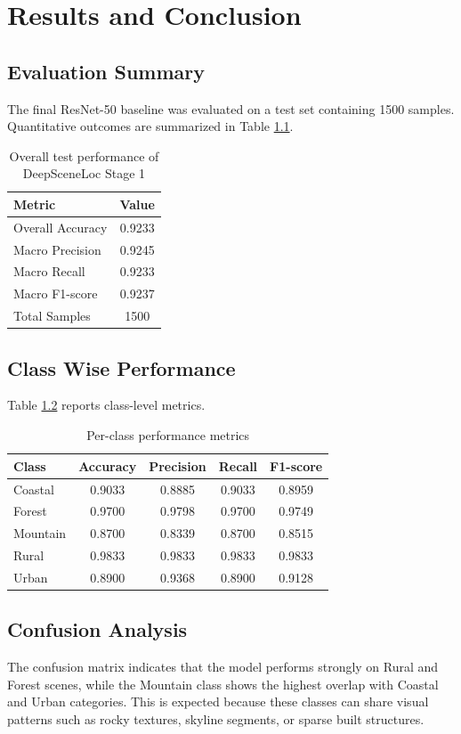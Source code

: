 \chapter{Results and Conclusion}

\section{Evaluation Summary}
The final ResNet-50 baseline was evaluated on a test set containing 1500 samples. Quantitative outcomes are summarized in Table \ref{tab:overall-metrics}.

\begin{table}[h]
\centering
\caption{Overall test performance of DeepSceneLoc Stage 1}
\label{tab:overall-metrics}
\begin{tabular}{lc}
\toprule
Metric & Value \\
\midrule
Overall Accuracy & 0.9233 \\
Macro Precision & 0.9245 \\
Macro Recall & 0.9233 \\
Macro F1-score & 0.9237 \\
Total Samples & 1500 \\
\bottomrule
\end{tabular}
\end{table}

\section{Class Wise Performance}
Table \ref{tab:class-metrics} reports class-level metrics.

\begin{table}[h]
\centering
\caption{Per-class performance metrics}
\label{tab:class-metrics}
\begin{tabular}{lcccc}
\toprule
Class & Accuracy & Precision & Recall & F1-score \\
\midrule
Coastal & 0.9033 & 0.8885 & 0.9033 & 0.8959 \\
Forest & 0.9700 & 0.9798 & 0.9700 & 0.9749 \\
Mountain & 0.8700 & 0.8339 & 0.8700 & 0.8515 \\
Rural & 0.9833 & 0.9833 & 0.9833 & 0.9833 \\
Urban & 0.8900 & 0.9368 & 0.8900 & 0.9128 \\
\bottomrule
\end{tabular}
\end{table}

\section{Confusion Analysis}
The confusion matrix indicates that the model performs strongly on Rural and Forest scenes, while the Mountain class shows the highest overlap with Coastal and Urban categories. This is expected because these classes can share visual patterns such as rocky textures, skyline segments, or sparse built structures.

